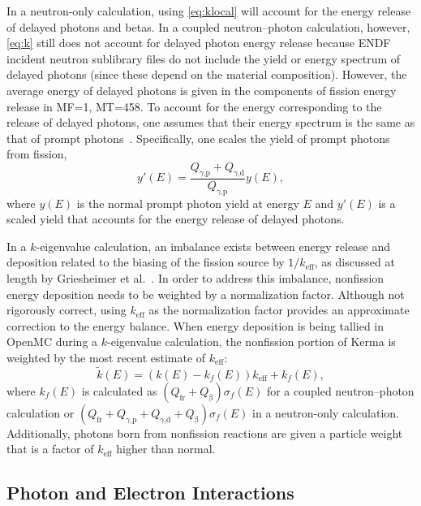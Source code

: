 \documentclass{anstrans}
\newcommand{\efr}{Q_\text{fr}}
\newcommand{\egp}{Q_\text{$\gamma$,p}}
\newcommand{\egd}{Q_\text{$\gamma$,d}}
\newcommand{\eb}{Q_\upbeta}
\begin{document}
In a neutron-only calculation, using \cref{eq:klocal} will account for the
energy release of delayed photons and betas. In a coupled
neutron--photon calculation, however, \cref{eq:k} still does not account for delayed
photon energy release because ENDF incident neutron sublibrary files do not
include the yield or energy spectrum of delayed photons (since these depend on
the material composition). However, the average energy of delayed photons is
given in the components of fission energy release in MF=1, MT=458. To account
for the energy corresponding to the release of delayed photons, one assumes
that their energy spectrum is the same as that of prompt
photons~\cite{tuominen2019ane}. Specifically, one scales the yield of
prompt photons from fission,
\begin{equation}
    y'(E) = \frac{\egp + \egd}{\egp} y(E),
\end{equation}
where $y(E)$ is the normal prompt photon yield at energy $E$ and $y'(E)$ is a
scaled yield that accounts for the energy release of delayed photons.

In a $k$-eigenvalue calculation, an imbalance exists between energy release
and deposition related to the biasing of the fission source by $1/k_\text{eff}$,
as discussed at length by Griesheimer et
al.~\cite{griesheimer2020physor}. In order to address this imbalance, nonfission energy
deposition needs to be weighted by a normalization factor. Although not
rigorously correct, using $k_\text{eff}$ as the normalization factor provides an
approximate correction to the energy balance. When energy deposition is being
tallied in OpenMC during a $k$-eigenvalue calculation, the nonfission portion
of Kerma is weighted by the most recent estimate of $k_\text{eff}$:
\begin{equation}
    \tilde{k}(E) = \left ( k(E) - k_f(E) \right) k_\text{eff} + k_f(E),
\end{equation}
where $k_f(E)$ is calculated as $\left ( \efr + \eb \right ) \sigma_f(E)$ for a
coupled neutron--photon calculation or $\left ( \efr + \egp + \egd + \eb \right)
\sigma_f(E)$ in a neutron-only calculation. Additionally, photons born from
nonfission reactions are given a particle weight that is a factor of
$k_\text{eff}$ higher than normal.


\subsection{Photon and Electron Interactions}
\end{document}
